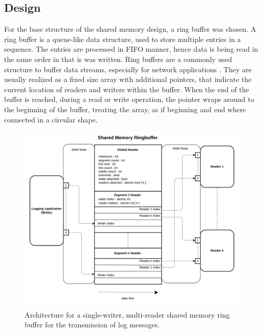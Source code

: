 \subsection{Design} \label{sec:rbuf_design}
For the base structure of the shared memory design, a ring buffer was chosen. A ring buffer is a queue-like data structure, used to store
multiple entries in a sequence. The entries are processed in \ac{FIFO} manner, hence data is being read in the same order in that is was written. 
Ring buffers are a commonly used structure to buffer data streams, especially for network applications \cite{barrington2015}.
They are usually realized as a fixed size array with additional pointers, that indicate the current location
of readers and writers within the buffer. When the end of the buffer is reached, during a read or write operation, the pointer
wraps around to the beginning of the buffer, treating the array, as if beginning and end where connected in a circular shape. 

\begin{figure}[h!]
    \includegraphics[width=\textwidth]{images/shm_architecture.png}
    \caption[Shared Memory Architecture]{Architecture for a single-writer, multi-reader shared memory ring buffer for the transmission
    of log messages.}
    \label{fig:shm_architecture}
\end{figure}

